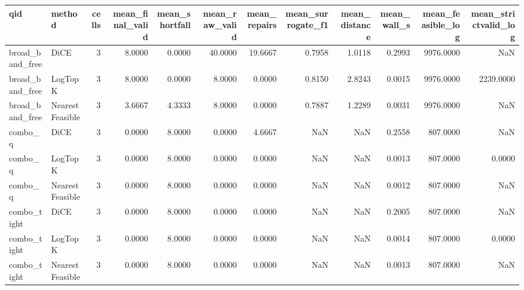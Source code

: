 \begin{tabular}{llrrrrrrrrrr}
\toprule
                 qid &          method &  cells &  mean\_final\_valid &  mean\_shortfall &  mean\_raw\_valid &  mean\_repairs &  mean\_surrogate\_f1 &  mean\_distance &  mean\_wall\_s &  mean\_feasible\_log &  mean\_strictvalid\_log \\
\midrule
     broad\_band\_free &            DiCE &      3 &            8.0000 &          0.0000 &         40.0000 &       19.6667 &             0.7958 &         1.0118 &       0.2993 &          9976.0000 &                   NaN \\
     broad\_band\_free &         LogTopK &      3 &            8.0000 &          0.0000 &          8.0000 &        0.0000 &             0.8150 &         2.8243 &       0.0015 &          9976.0000 &             2239.0000 \\
     broad\_band\_free & NearestFeasible &      3 &            3.6667 &          4.3333 &          8.0000 &        0.0000 &             0.7887 &         1.2289 &       0.0031 &          9976.0000 &                   NaN \\
             combo\_q &            DiCE &      3 &            0.0000 &          8.0000 &          0.0000 &        4.6667 &                NaN &            NaN &       0.2558 &           807.0000 &                   NaN \\
             combo\_q &         LogTopK &      3 &            0.0000 &          8.0000 &          0.0000 &        0.0000 &                NaN &            NaN &       0.0013 &           807.0000 &                0.0000 \\
             combo\_q & NearestFeasible &      3 &            0.0000 &          8.0000 &          0.0000 &        0.0000 &                NaN &            NaN &       0.0012 &           807.0000 &                   NaN \\
         combo\_tight &            DiCE &      3 &            0.0000 &          8.0000 &          0.0000 &        0.0000 &                NaN &            NaN &       0.2005 &           807.0000 &                   NaN \\
         combo\_tight &         LogTopK &      3 &            0.0000 &          8.0000 &          0.0000 &        0.0000 &                NaN &            NaN &       0.0014 &           807.0000 &                0.0000 \\
         combo\_tight & NearestFeasible &      3 &            0.0000 &          8.0000 &          0.0000 &        0.0000 &                NaN &            NaN &       0.0013 &           807.0000 &                   NaN \\

\end{tabular}
